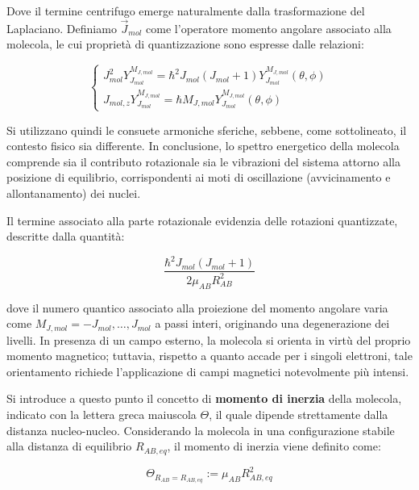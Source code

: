 Dove il termine centrifugo emerge naturalmente dalla trasformazione del Laplaciano. Definiamo \(\vec{J}_{mol}\) come l'operatore momento angolare associato alla molecola, le cui proprietà di quantizzazione sono espresse dalle relazioni:

\begin{equation}
    \begin{cases} 
        J_{mol}^2 Y_{J_{mol}}^{M_{J, mol}} = \hbar^2 J_{mol}(J_{mol} + 1) Y_{J_{mol}}^{M_{J, mol}}(\theta, \phi) \\
        J_{mol, z} Y_{J_{mol}}^{M_{J, mol}} = \hbar M_{J, mol} Y_{J_{mol}}^{M_{J, mol}}(\theta, \phi)
    \end{cases}
\end{equation}

Si utilizzano quindi le consuete armoniche sferiche, sebbene, come sottolineato, il contesto fisico sia differente. In conclusione, lo spettro energetico della molecola comprende sia il contributo rotazionale sia le vibrazioni del sistema attorno alla posizione di equilibrio, corrispondenti ai moti di oscillazione (avvicinamento e allontanamento) dei nuclei.

Il termine associato alla parte rotazionale evidenzia delle rotazioni quantizzate, descritte dalla quantità:

\begin{equation}
    \frac{\hbar^2 J_{mol}(J_{mol}+1)}{2\mu_{AB} R_{AB}^2}
\end{equation}

dove il numero quantico associato alla proiezione del momento angolare varia come \( M_{J,mol} = -J_{mol}, \dots, J_{mol} \) a passi interi, originando una degenerazione dei livelli. 
In presenza di un campo esterno, la molecola si orienta in virtù del proprio momento magnetico; tuttavia, rispetto a quanto accade per i singoli elettroni, tale orientamento richiede l'applicazione di campi magnetici notevolmente più intensi.

Si introduce a questo punto il concetto di \textbf{momento di inerzia} della molecola, indicato con la lettera greca maiuscola \( \Theta \), il quale dipende strettamente dalla distanza nucleo-nucleo. Considerando la molecola in una configurazione stabile alla distanza di equilibrio \( R_{AB,eq} \), il momento di inerzia viene definito come:

\begin{equation}
    \Theta_{R_{AB} = R_{AB,eq}} := \mu_{AB} R_{AB,eq}^2
\end{equation}

